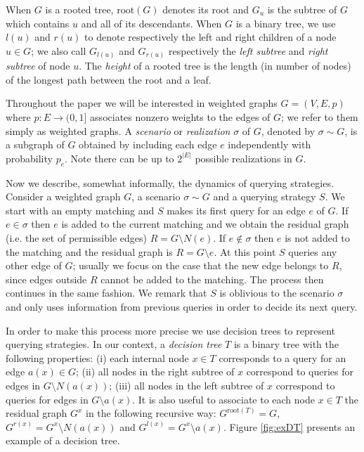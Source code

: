\documentclass[12pt]{article}
\newcommand{\ro}[1]{\textrm{root}(#1)}
\begin{document}
	  When $G$ is a rooted tree, $\ro{G}$ denotes its root and $G_u$ is the subtree of $G$ which contains $u$ and all of its descendants. When $G$ is a binary tree, we use $l(u)$ and $r(u)$ to denote respectively the left and right children of a node $u \in G$; we also call $G_{l(u)}$ and $G_{r(u)}$ respectively the \emph{left subtree} and \emph{right subtree} of node $u$. The \emph{height} of a rooted tree is the length (in number of nodes) of the longest path between the root and a leaf.
	
	 Throughout the paper we will be interested in weighted graphs $G = (V, E, p)$ where $p : E \rightarrow (0,1]$ associates nonzero weights to the edges of $G$; we refer to them simply as weighted graphs. A \emph{scenario} or \emph{realization} $\sigma$ of $G$, denoted by $\sigma \sim G$, is a subgraph of $G$ obtained by including each edge $e$ independently with probability $p_e$. Note there can be up to $2^{|E|}$ possible realizations in $G$.

		Now we describe, somewhat informally, the dynamics of querying strategies. Consider a weighted graph $G$, a scenario $\sigma \sim G$ and a querying strategy $S$. We start with an empty matching and $S$ makes its first query for an edge $e$ of $G$. If $e \in \sigma$ then $e$ is added to the current matching and we obtain the residual graph (i.e. the set of permissible edges) $R = G \setminus N(e)$. If $e \notin \sigma$ then $e$ is not added to the matching and the residual graph is $R = G \setminus e$. At this point $S$ queries any other edge of $G$; usually we focus on the case that the new edge belongs to $R$, since edges outside $R$ cannot be added to the matching. The process then continues in the same fashion. We remark that $S$ is oblivious to the scenario $\sigma$ and only uses information from previous queries in order to decide its next query.
				
	  In order to make this process more precise we use decision trees to represent querying strategies. In our context, a \emph{decision tree} $T$ is a binary tree with the following properties: (i) each internal node $x \in T$ corresponds to a query for an edge $a(x) \in G$; (ii) all nodes in the right subtree of $x$ correspond to queries for edges in $G \setminus N(a(x))$; (iii) all nodes in the left subtree of $x$ correspond to queries for edges in $G \setminus a(x)$.
It is also useful to associate to each node $x \in T$ the residual graph $G^x$ in the following recursive way: $G^{\ro{T}} = G$, $G^{r(x)} = G^x \setminus N(a(x))$ and $G^{l(x)} = G^x \setminus a(x)$. Figure \ref{fig:exDT} presents an example of a decision tree.
	  
\end{document}
